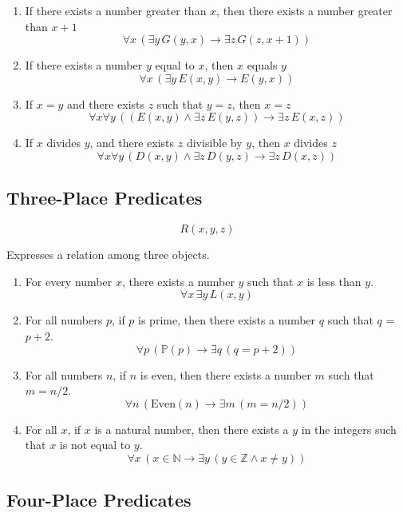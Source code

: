 \documentclass[12pt,a4paper,openany]{article}
\begin{document}
\begin{enumerate}
\def\labelenumi{\arabic{enumi}.}
\item
  If there exists a number greater than \(x\), then there exists a
  number greater than \(x+1\)
  \[\forall x \, (\exists y \, G(y,x) \rightarrow \exists z \, G(z,x+1))\]
\item
  If there exists a number \(y\) equal to \(x\), then \(x\) equals \(y\)
  \[\forall x \, (\exists y \, E(x,y) \rightarrow E(y,x))\]
\item
  If \(x=y\) and there exists \(z\) such that \(y=z\), then \(x=z\)
  \[\forall x \forall y \, ((E(x,y) \land \exists z \, E(y,z)) \rightarrow \exists z \, E(x,z))\]
\item
  If \(x\) divides \(y\), and there exists \(z\) divisible by \(y\),
  then \(x\) divides \(z\)
  \[\forall x \forall y \, (D(x,y) \land \exists z \, D(y,z) \rightarrow \exists z \, D(x,z))\]
\end{enumerate}

\subsection{Three-Place Predicates}\label{three-place-predicates}

\[R(x,y,z)\]

Expresses a relation among three objects.

\begin{enumerate}
\def\labelenumi{\arabic{enumi}.}
\item
  For every number \(x\), there exists a number \(y\) such that \(x\) is
  less than \(y\). \[\forall x \, \exists y \, L(x,y)\]
\item
  For all numbers \(p\), if \(p\) is prime, then there exists a number
  \(q\) such that \(q\) = \(p + 2\).
  \[\forall p \, (\mathbb{P}(p) \rightarrow \exists q \, (q = p+2))\]
\item
  For all numbers \(n\), if \(n\) is even, then there exists a number
  \(m\) such that \(m = n/2\).
  \[\forall n \, (\text{Even}(n) \rightarrow \exists m \, (m = n/2))\]
\item
  For all \(x\), if \(x\) is a natural number, then there exists a \(y\)
  in the integers such that \(x\) is not equal to \(y\).
  \[\forall x \, (x \in \mathbb{N} \rightarrow \exists y \, (y \in \mathbb{Z} \land x \neq y))\]
\end{enumerate}

\subsection{Four-Place Predicates}\label{four-place-predicates}
\end{document}
